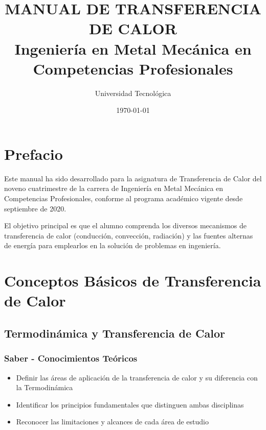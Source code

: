 \documentclass[12pt,a4paper,twoside]{book}
\title{\textbf{MANUAL DE TRANSFERENCIA DE CALOR}\\
	\large Ingeniería en Metal Mecánica en Competencias Profesionales}
\author{Universidad Tecnológica}
\date{\today}
\begin{document}
	
	\frontmatter
	\maketitle
	
	\tableofcontents
	\listoffigures
	\listoftables
	
	\chapter*{Prefacio}
	Este manual ha sido desarrollado para la asignatura de Transferencia de Calor del noveno cuatrimestre de la carrera de Ingeniería en Metal Mecánica en Competencias Profesionales, conforme al programa académico vigente desde septiembre de 2020.
	
	El objetivo principal es que el alumno comprenda los diversos mecanismos de transferencia de calor (conducción, convección, radiación) y las fuentes alternas de energía para emplearlos en la solución de problemas en ingeniería.
	
	\mainmatter
	
	\chapter{Conceptos Básicos de Transferencia de Calor}
	\label{chap:conceptos_basicos}
	
	\section{Termodinámica y Transferencia de Calor}
	\label{sec:termodinamica_transferencia}
	
	\subsection{Saber - Conocimientos Teóricos}
	\begin{saberbox}
		\begin{itemize}
			\item Definir las áreas de aplicación de la transferencia de calor y su diferencia con la Termodinámica
			\item Identificar los principios fundamentales que distinguen ambas disciplinas
			\item Reconocer las limitaciones y alcances de cada área de estudio
		\end{itemize}
	\end{saberbox}
	
\end{document}
